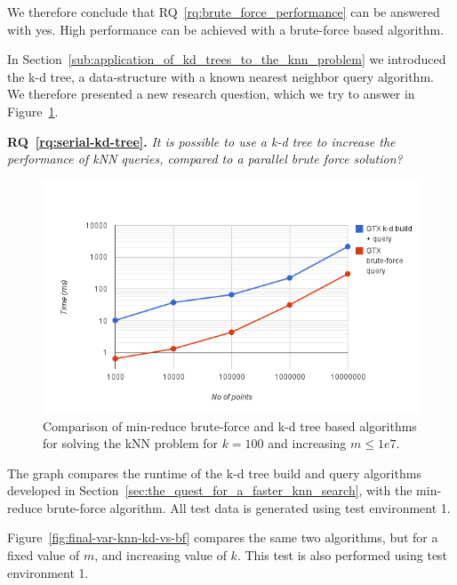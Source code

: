 We therefore conclude that RQ~\ref{rq:brute_force_performance} can be answered with yes. High performance can be achieved with a brute-force based algorithm.

In Section~\ref{sub:application_of_kd_trees_to_the_knn_problem} we introduced the k-d tree, a data-structure with a known  nearest neighbor query algorithm. We therefore presented a new research question, which we try to answer in Figure~\ref{fig:final-knn-kd-vs-bf}.

\textbf{RQ~\ref{rq:serial-kd-tree}.} \emph{It is possible to use a k-d tree to increase the performance of kNN queries, compared to a parallel brute force solution?}

\begin{figure}[ht!]
    \centering
    \includegraphics[width=120mm]{../gfx/final-knn-kd-vs-bf.png}
    \caption{Comparison of min-reduce brute-force and k-d tree based algorithms for solving the kNN problem for $k=100$ and increasing $m\le1e7$.}
    \label{fig:final-knn-kd-vs-bf}
\end{figure}

The graph compares the runtime of the k-d tree build and query algorithms developed in Section~\ref{sec:the_quest_for_a_faster_knn_search}, with the min-reduce brute-force algorithm. All test data is generated using test environment 1.

Figure~\ref{fig:final-var-knn-kd-vs-bf} compares the same two algorithms, but for a fixed value of $m$, and increasing value of $k$. This test is also performed using test environment 1.

